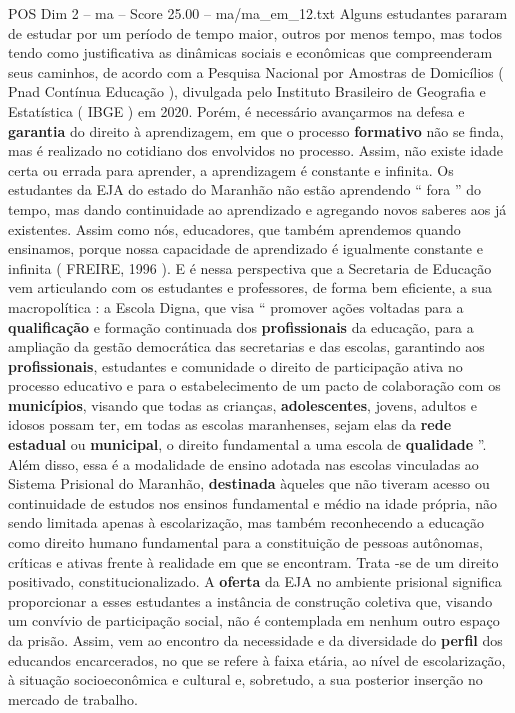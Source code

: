 \begin{textsample}{POS Dim 2 – ma – Score 25.00 – ma/ma\_em\_12.txt}
Alguns estudantes pararam de estudar por um período de tempo maior, outros por menos tempo, mas todos tendo como justificativa as dinâmicas sociais e econômicas que compreenderam seus caminhos, de acordo com a Pesquisa Nacional por Amostras de Domicílios ( Pnad Contínua Educação ), divulgada pelo Instituto Brasileiro de Geografia e Estatística ( IBGE ) em 2020.
Porém, é necessário avançarmos na defesa e \textbf{garantia} do direito à aprendizagem, em que o processo \textbf{formativo} não se finda, mas é realizado no cotidiano dos envolvidos no processo.
Assim, não existe idade certa ou errada para aprender, a aprendizagem é constante e infinita.
Os estudantes da EJA do estado do Maranhão não estão aprendendo “ fora ” do tempo, mas dando continuidade ao aprendizado e agregando novos saberes aos já existentes.
Assim como nós, educadores, que também aprendemos quando ensinamos, porque nossa capacidade de aprendizado é igualmente constante e infinita ( FREIRE, 1996 ).
E é nessa perspectiva que a Secretaria de Educação vem articulando com os estudantes e professores, de forma bem eficiente, a sua macropolítica : a Escola Digna, que visa “ promover ações voltadas para a \textbf{qualificação} e formação continuada dos \textbf{profissionais} da educação, para a ampliação da gestão democrática das secretarias e das escolas, garantindo aos \textbf{profissionais}, estudantes e comunidade o direito de participação ativa no processo educativo e para o estabelecimento de um pacto de colaboração com os \textbf{municípios}, visando que todas as crianças, \textbf{adolescentes}, jovens, adultos e idosos possam ter, em todas as escolas maranhenses, sejam elas da \textbf{rede} \textbf{estadual} ou \textbf{municipal}, o direito fundamental a uma escola de \textbf{qualidade} ”.
Além disso, essa é a modalidade de ensino adotada nas escolas vinculadas ao Sistema Prisional do Maranhão, \textbf{destinada} àqueles que não tiveram acesso ou continuidade de estudos nos ensinos fundamental e médio na idade própria, não sendo limitada apenas à escolarização, mas também reconhecendo a educação como direito humano fundamental para a constituição de pessoas autônomas, críticas e ativas frente à realidade em que se encontram.
Trata -se de um direito positivado, constitucionalizado.
A \textbf{oferta} da EJA no ambiente prisional significa proporcionar a esses estudantes a instância de construção coletiva que, visando um convívio de participação social, não é contemplada em nenhum outro espaço da prisão.
Assim, vem ao encontro da necessidade e da diversidade do \textbf{perfil} dos educandos encarcerados, no que se refere à faixa etária, ao nível de escolarização, à situação socioeconômica e cultural e, sobretudo, a sua posterior inserção no mercado de trabalho.

\end{textsample}
